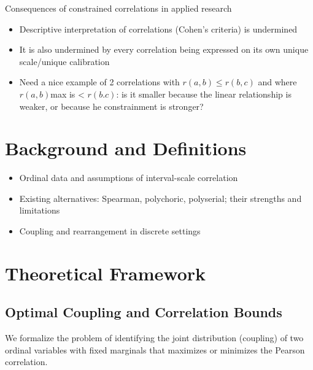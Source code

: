\documentclass[
  12pt,
]{article}
\providecommand{\tightlist}{%
  \setlength{\itemsep}{0pt}\setlength{\parskip}{0pt}}\usepackage{longtable,booktabs,array}
\theoremstyle{plain}
\theoremstyle{definition}
\theoremstyle{remark}
\begin{document}
Consequences of constrained correlations in applied research

\begin{itemize}
\tightlist
\item
  Descriptive interpretation of correlations (Cohen's criteria) is
  undermined
\item
  It is also undermined by every correlation being expressed on its own
  unique scale/unique calibration
\item
  Need a nice example of 2 correlations with \(r(a,b) \le r(b,c)\) and
  where \(r(a,b)\)max is \textless{} \(r(b.c)\): is it smaller because
  the linear relationship is weaker, or because he constrainment is
  stronger?
\end{itemize}

\section{Background and Definitions}\label{background-and-definitions}

\begin{itemize}
\tightlist
\item
  Ordinal data and assumptions of interval-scale correlation\\
\item
  Existing alternatives: Spearman, polychoric, polyserial; their
  strengths and limitations\\
\item
  Coupling and rearrangement in discrete settings
\end{itemize}

\section{Theoretical Framework}\label{theoretical-framework}

\subsection{Optimal Coupling and Correlation
Bounds}\label{optimal-coupling-and-correlation-bounds}

We formalize the problem of identifying the joint distribution
(coupling) of two ordinal variables with fixed marginals that maximizes
or minimizes the Pearson correlation.
\end{document}
